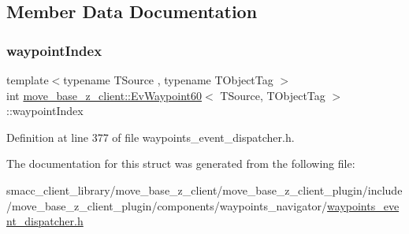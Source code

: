 \subsection{Member Data Documentation}
\mbox{\label{structmove__base__z__client_1_1EvWaypoint60_a03c96271900b3f3a230a7d7df7b5315a}} 
\subsubsection{\texorpdfstring{waypoint\+Index}{waypointIndex}}
{\footnotesize\ttfamily template$<$typename T\+Source , typename T\+Object\+Tag $>$ \\
int \hyperlink{structmove__base__z__client_1_1EvWaypoint60}{move\+\_\+base\+\_\+z\+\_\+client\+::\+Ev\+Waypoint60}$<$ T\+Source, T\+Object\+Tag $>$\+::waypoint\+Index}



Definition at line 377 of file waypoints\+\_\+event\+\_\+dispatcher.\+h.



The documentation for this struct was generated from the following file\+:\begin{DoxyCompactItemize}
\item 
smacc\+\_\+client\+\_\+library/move\+\_\+base\+\_\+z\+\_\+client/move\+\_\+base\+\_\+z\+\_\+client\+\_\+plugin/include/move\+\_\+base\+\_\+z\+\_\+client\+\_\+plugin/components/waypoints\+\_\+navigator/\hyperlink{waypoints__event__dispatcher_8h}{waypoints\+\_\+event\+\_\+dispatcher.\+h}\end{DoxyCompactItemize}
